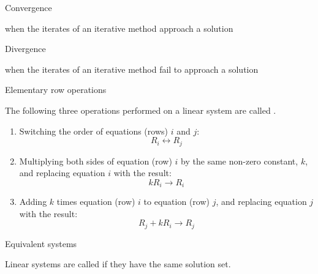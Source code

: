 \documentclass{ximera}
\begin{document}
Convergence
\begin{expandable}
    when the iterates of an iterative method approach a solution
\end{expandable}


Divergence
\begin{expandable}
    when the iterates of an iterative method fail to approach a solution
\end{expandable}



Elementary row operations
\begin{expandable}
    The following three operations performed on a linear system are called .
\begin{enumerate}
\item Switching the order of equations (rows) $i$ and $j$:
$$R_i\leftrightarrow R_j$$
\item Multiplying both sides of equation (row) $i$ by the same non-zero constant, $k$, and replacing equation $i$ with the result:
$$kR_i\rightarrow R_i$$
\item Adding $k$ times equation (row) $i$ to equation (row) $j$, and replacing equation $j$ with the result:
$$R_j+kR_i\rightarrow R_j$$
\end{enumerate}
\end{expandable}


Equivalent systems
\begin{expandable}
    Linear systems are called  if they have the same solution set.
\end{expandable}

\end{document}
